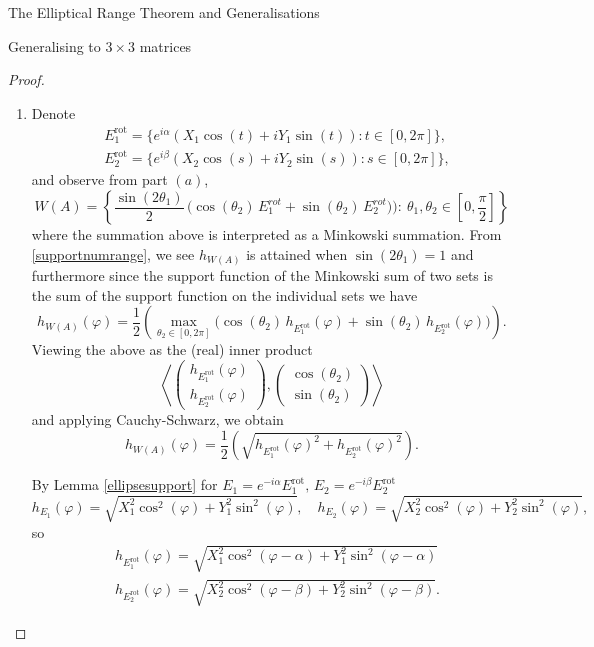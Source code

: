 \documentclass[12pt]{article}
\theoremstyle{plain}
\theoremstyle{definition}
\theoremstyle{remark}
\renewcommand{\phi}{\varphi}
\numberwithin{equation}{section}
\begin{document}
\begin{section}{The Elliptical Range Theorem and Generalisations}
\begin{subsection}{Generalising to $3 \times 3$ matrices}
\begin{proof}
\begin{enumerate}
\item Denote
\[
\begin{aligned}
    &E_1^{\text{rot}} = \{ e^{i\alpha} (X_1  \cos (t) + i Y_1  \sin (t)) : t \in [0,2\pi] \}, \\
    &E_2^{\text{rot}} = \{ e^{i\beta} (X_2 \cos (s) + i Y_2 \sin (s)) : s \in [0,2\pi] \},
\end{aligned}
\]
and observe from part $(a)$,
\begin{equation}\label{supportnumrange}
    W(A) = \left\{ \frac{\sin( 2 \theta_1)}{2} \,\Big(
\cos(\theta_2) \, E_{1}^{rot} + \sin(\theta_2) \, E_{2}^{rot})
\Big) :  \ \theta_1, \theta_2 \in \left[0, \frac{\pi}{2}\right] \right\}
\end{equation}
where the summation above is interpreted as a Minkowski summation.
From \eqref{supportnumrange}, we see $h_{W(A)} $ is attained when $\sin (2 \theta_1) = 1$ and furthermore since the support function of the Minkowski sum of two sets is the sum of the support function on the individual sets we have
\[
h_{W(A)}(\phi) = \frac{1}{2} \left(\max_{\theta_2 \in [0, 2 \pi]} \big( \cos(\theta_2) \, h_{E_1^{\text{rot}}}(\phi) + \sin( \theta_2)\, h_{E_2^{\text{rot}}}(\phi) \big) \right).
\]
Viewing the above as the (real) inner product  $$\left\langle \begin{pmatrix}
    h_{E_1^{\text{rot}}}(\phi) \\
    h_{E_2^{\text{rot}}}(\phi)
\end{pmatrix},  \begin{pmatrix}
    \cos( \theta_2) \\
    \sin( \theta_2)
\end{pmatrix} \right\rangle
$$
and applying Cauchy-Schwarz, we obtain
\begin{equation}\label{support2}
h_{W(A)}(\phi)=\frac{1}{2} \left( \sqrt{ h_{E_1^{\text{rot}}}(\phi)^2 + h_{E_2^{\text{rot}}}(\phi)^2 } \right).
\end{equation}





By Lemma \ref{ellipsesupport} for $E_1 = e^{-i \alpha}E_1^{\text{rot}}, \, E_2 = e^{-i \beta}E_2^{\text{rot}}$
\[
h_{E_1}(\phi) = \sqrt{X_1^2 \cos^2 (\phi) + Y_1^2 \sin^2 (\phi)},\quad
h_{E_2}(\phi) = \sqrt{X_2^2 \cos^2 (\phi) + Y_2^2 \sin^2 (\phi)},
\]
so 
\[
\begin{aligned}
&h_{E_1^{\text{rot}}}(\phi) = \sqrt{X_1^2 \cos^2(\phi-\alpha) + Y_1^2 \sin^2(\phi-\alpha)}\\
&h_{E_2^{\text{rot}}}(\phi) = \sqrt{X_2^2 \cos^2(\phi-\beta) + Y_2^2 \sin^2(\phi-\beta)}.
\end{aligned}
\]




\end{enumerate}
\end{proof}
\end{subsection}
\end{section}
\end{document}
